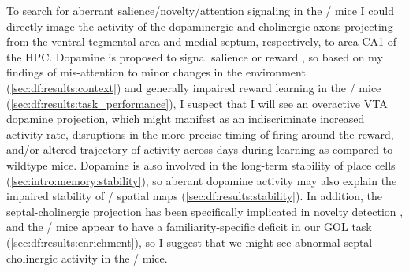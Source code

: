 To search for aberrant salience/novelty/attention signaling in the \df/ mice I could directly image the activity of the dopaminergic and cholinergic axons projecting from the ventral tegmental area and medial septum, respectively, to area CA1 of the \ac{HPC}.
Dopamine is proposed to signal salience or reward \citep{Berridge1998}, so based on my findings of mis-attention to minor changes in the environment (\autoref{sec:df:results:context}) and generally impaired reward learning in the \df/ mice (\autoref{sec:df:results:task_performance}), I suspect that I will see an overactive VTA dopamine projection, which might manifest as an indiscriminate increased activity rate, disruptions in the more precise timing of firing around the reward, and/or altered trajectory of activity across days during learning as compared to wildtype mice.
Dopamine is also involved in the long-term stability of place cells (\autoref{sec:intro:memory:stability}), so aberant dopamine activity may also explain the impaired stability of \df/ spatial maps (\autoref{sec:df:results:stability}).
In addition, the septal-cholinergic projection has been specifically implicated in novelty detection \citep{Jeewajee2008, Barry2012c}, and the \df/ mice appear to have a familiarity-specific deficit in our \ac{GOL} task (\autoref{sec:df:results:enrichment}), so I suggest that we might see abnormal septal-cholinergic activity in the \df/ mice.


